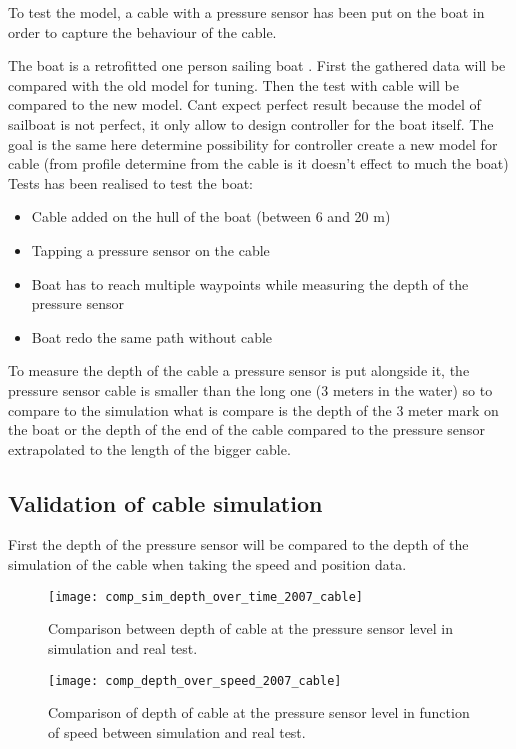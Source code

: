 To test the model, a cable with a pressure sensor has been put on the boat in order to capture the behaviour
of the cable.

The boat is a retrofitted one person sailing boat . 
First the gathered data will be compared with the old model for tuning. Then the test with cable will be compared to the new model.
Cant expect perfect result because the model of sailboat is not perfect, it only allow to design controller for the boat itself. The goal is the same here determine possibility for controller create a new model for cable (from profile determine from the cable is it doesn't effect to much the boat)
Tests has been realised to test the boat:

\begin{itemize}
\item Cable added on the hull of the boat (between 6 and 20 m)
\item Tapping a pressure sensor on the cable
\item Boat has to reach multiple waypoints while measuring the depth of the pressure sensor
\item Boat redo the same path without cable
\end{itemize}

To measure the depth of the cable a pressure sensor is put alongside it, the pressure sensor cable is smaller than 
the long one (3 meters in the water) so to compare to the simulation what is compare is the depth of the 3 meter mark on the boat or the depth of the end of the cable compared to the pressure sensor extrapolated to the length of the bigger cable.

\subsection{Validation of cable simulation}

First the depth of the pressure sensor will be compared to the depth of the simulation of the cable when taking the speed and position data.

\begin{figure}[H]
\centering
    \begin{minipage}[b]{0.4\textwidth}
    \centering
    \texttt{[image: comp\_sim\_depth\_over\_time\_2007\_cable]}
    \caption{Comparison between depth of cable at the pressure sensor level in simulation and real test.}
    \label{fig:comp_depth_time_2007}
    \end{minipage}
    \hfill
    \begin{minipage}[b]{0.45\textwidth}
    \centering
    \texttt{[image: comp\_depth\_over\_speed\_2007\_cable]}
    \caption{Comparison of depth of cable at the pressure sensor level in function of speed between simulation and real test.}
    \label{fig:comp_depth_speed_2007}
    \end{minipage}
\end{figure}
